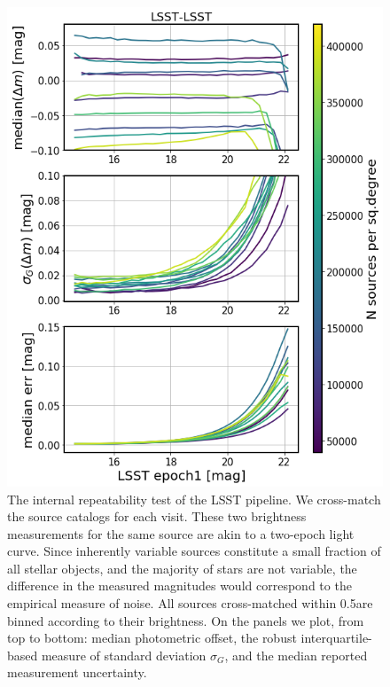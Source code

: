 \documentclass[DM,lsstdraft,toc,usenatbib]{lsstdoc}
\begin{document}
\begin{figure}
\begin{centering}
\includegraphics[width=0.8\columnwidth]{figs/lsst-lsst_rms_plot.png}
\caption{The internal repeatability test of the LSST pipeline. We cross-match the source catalogs for each visit. These two brightness measurements for the same source are akin to a two-epoch light curve. Since inherently variable sources constitute a small fraction of all stellar objects, and the majority of stars are not variable, the difference in the measured magnitudes would correspond to the empirical measure of noise.  All sources cross-matched within 0.5\arcsec are binned according to their brightness. On the panels we plot, from top to bottom: median photometric offset, the robust interquartile-based measure of standard deviation $\sigma_{G}$, and the median reported measurement uncertainty.}
\label{fig:epoch_lsst_multiplot}
\end{centering}
\end{figure} 
\end{document}
